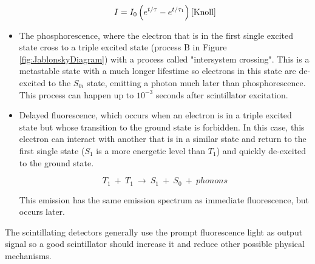 \begin{itemize}
\begin{equation}
I=I_0\left(e^{t/\tau} - e^{t/\tau_1}\right) \cite{Knoll}
\label{eq:IntensityTimeScintillator}
\end{equation}

\item{} The phosphorescence, where the electron that is in the first single excited state cross to a triple excited state (process B in Figure \ref{fig:JablonskyDiagram}) with a process called "intersystem crossing". This is a metastable state with a much longer lifestime so electrons in this state are de-excited to the $S_{0i}$ state, emitting a photon much later than phosphorescence. This process can happen up to $10^{-3}$ seconds after scintillator excitation.

\item{} Delayed fluorescence, which occurs when an electron is in a triple excited state but whose transition to the ground state is forbidden. In this case, this electron can interact with another that is in a similar state and return to the first single state ($S_{1}$ is a more energetic level than $T_{1}$) and quickly de-excited to the ground state. 

\begin{equation}
T_{1} ~+~ T_{1}~ \longrightarrow ~ S_{1} ~+~ S_{0} ~+~ phonons
\label{eq:DelayFluorescence}
\end{equation}

This emission has the same emission spectrum as immediate fluorescence, but occurs later.

\end{itemize}

The scintillating detectors generally use the prompt fluorescence light as output signal so a good scintillator should increase it and reduce other possible physical mechanisms.